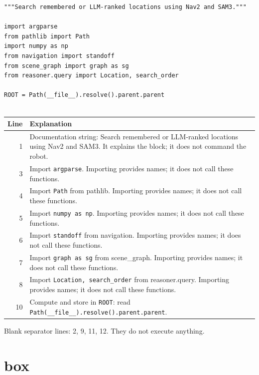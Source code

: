 \documentclass[11pt,a4paper]{book}
\begin{document}
\begin{lstlisting}[firstnumber=1]
"""Search remembered or LLM-ranked locations using Nav2 and SAM3."""

import argparse
from pathlib import Path
import numpy as np
from navigation import standoff
from scene_graph import graph as sg
from reasoner.query import Location, search_order

ROOT = Path(__file__).resolve().parent.parent


\end{lstlisting}

\begin{longtable}{r p{}}

\textbf{Line} & \textbf{Explanation} \\ \hline \endhead

1 & Documentation string: Search remembered or LLM-ranked locations using Nav2 and SAM3. It explains the block; it does not command the robot. \\

3 & Import \texttt{argparse}. Importing provides names; it does not call these functions. \\

4 & Import \texttt{Path} from pathlib. Importing provides names; it does not call these functions. \\

5 & Import \texttt{numpy as np}. Importing provides names; it does not call these functions. \\

6 & Import \texttt{standoff} from navigation. Importing provides names; it does not call these functions. \\

7 & Import \texttt{graph as sg} from scene\_graph. Importing provides names; it does not call these functions. \\

8 & Import \texttt{Location, search\_order} from reasoner.query. Importing provides names; it does not call these functions. \\

10 & Compute and store in \texttt{ROOT}: read \texttt{Path(\_\_file\_\_).resolve().parent.parent}.  \\

\end{longtable}

Blank separator lines: 2, 9, 11, 12. They do not execute anything.

\section{box}
\end{document}
